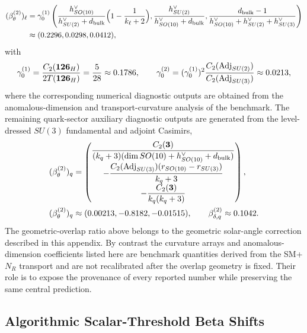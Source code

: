 \documentclass[11pt]{article}
\begin{document}
\begin{align}
 (\beta_{\theta}^{(2)})_{\ell}
 &=
 \gamma_0^{(1)}\left(
 \frac{h^{\vee}_{SO(10)}}{h^{\vee}_{SU(2)}+d_{\rm bulk}}\Bigl(1-\frac{1}{k_{\ell}+2}\Bigr),
 \frac{h^{\vee}_{SU(2)}}{h^{\vee}_{SO(10)}+d_{\rm bulk}},
 \frac{d_{\rm bulk}-1}{h^{\vee}_{SO(10)}+h^{\vee}_{SU(2)}+h^{\vee}_{SU(3)}}
 \right) \\
 &\approx (0.2296,0.0298,0.0412),
\end{align}
with
\begin{equation}
 \gamma_0^{(1)}=\frac{C_2(\mathbf{126}_H)}{2T(\mathbf{126}_H)}=\frac{5}{28}\approx0.1786,
 \qquad
 \gamma_0^{(2)}=(\gamma_0^{(1)})^2\frac{C_2({\rm Adj}_{SU(2)})}{C_2({\rm Adj}_{SU(3)})}\approx0.0213,
\end{equation}
where the corresponding numerical diagnostic outputs are obtained from the anomalous-dimension and transport-curvature analysis of the benchmark. The remaining quark-sector auxiliary diagnostic outputs are generated from the level-dressed $SU(3)$ fundamental and adjoint Casimirs,
\begin{align}
 (\beta_{\theta}^{(2)})_{q}
 &=\left(
 \begin{array}{@{}c@{}}
 \dfrac{C_2(\mathbf 3)}{(k_q+3)(\dim SO(10)+h^{\vee}_{SO(10)}+d_{\rm bulk})} \\
 -\dfrac{C_2({\rm Adj}_{SU(3)})(r_{SO(10)}-r_{SU(3)})}{k_q+3} \\
 -\dfrac{C_2(\mathbf 3)}{k_q(k_q+3)}
 \end{array}
 \right), \\
 (\beta_{\theta}^{(2)})_{q}
 &\approx(0.00213,-0.8182,-0.01515),
 \qquad
 \beta_{\delta,q}^{(2)}\approx0.1042.
\end{align}
The geometric-overlap ratio above belongs to the geometric solar-angle correction described in this appendix. By contrast the curvature arrays and anomalous-dimension coefficients listed here are benchmark quantities derived from the SM+$N_R$ transport and are not recalibrated after the overlap geometry is fixed. Their role is to expose the provenance of every reported number while preserving the same central prediction.

\subsection{Algorithmic Scalar-Threshold Beta Shifts}
\end{document}
